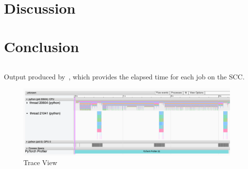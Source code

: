 \documentclass[12pt, a4paper, hidelinks]{article}
\begin{document}
\section{Discussion}
\label{sec:discussion}

\section{Conclusion}
\label{sec:conclusion}




\newpage
\printbibliography[heading=bibintoc]

\appendix
\break

\renewcommand*{\thepage}{A\arabic{page}}

\begin{listing}[H]
\inputminted[xleftmargin=1em,linenos]{python}{./assets/sacct.out}
\caption[Sacct output]{Output produced by~, which provides the elapsed time for each job on the \ac{SCC}.}
\label{lst:sacct_out}
\end{listing}

\begin{figure}[H]
\centering
\includegraphics[width=1\textwidth]{./assets/scap_gtx1080_profiler-torch_batch-size-64_14650758_trace-view}
\caption*{Trace View}
\label{fig:scap_gtx1080_profiler-torch_batch-size-64_14650758_trace-view}
\end{figure}
\end{document}
